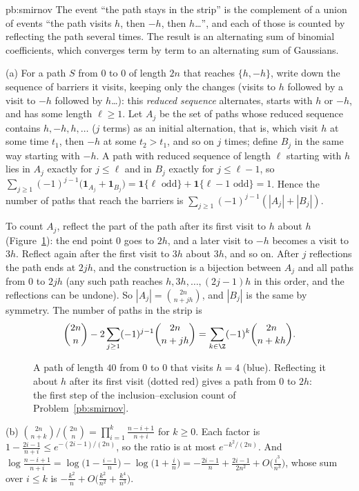 \begin{solution}{pb:smirnov}
\idea The event ``the path stays in the strip'' is the complement of a union of events ``the path visits $h$, then $-h$, then $h$\dots'', and each of those is counted by
reflecting the path several times. The result is an alternating sum of binomial coefficients, which converges term by term to an alternating sum of Gaussians.

\writeup (a) For a path $S$ from $0$ to $0$ of length $2n$ that reaches $\{h,-h\}$, write down the sequence of barriers it visits, keeping only the changes (visits to $h$
followed by a visit to $-h$ followed by $h$\dots): this \emph{reduced sequence} alternates, starts with $h$ or $-h$, and has some length $\ell\ge1$. Let $A_j$ be the set of
paths whose reduced sequence contains $h,-h,h,\dots$ ($j$ terms) as an initial alternation, that is, which visit $h$ at some time $t_1$, then $-h$ at some $t_2>t_1$, and
so on $j$ times; define $B_j$ in the same way starting with $-h$. A path with reduced sequence of length $\ell$ starting with $h$ lies in $A_j$ exactly for $j\le\ell$
and in $B_j$ exactly for $j\le\ell-1$, so $\sum_{j\ge1}(-1)^{j-1}\bigl(\mathbf 1_{A_j}+\mathbf 1_{B_j}\bigr)=\mathbf 1\{\ell\text{ odd}\}+\mathbf 1\{\ell-1\text{ odd}\}=1$. Hence the number of
paths that reach the barriers is $\sum_{j\ge1}(-1)^{j-1}(|A_j|+|B_j|)$.

To count $A_j$, reflect the part of the path after its first visit to $h$ about $h$ (Figure~\ref{fig:strip}): the end point $0$ goes to $2h$, and a later visit to $-h$
becomes a visit to $3h$. Reflect again after the first visit to $3h$ about $3h$, and so on. After $j$ reflections the path ends at $2jh$, and the construction is a bijection
between $A_j$ and all paths from $0$ to $2jh$ (any such path reaches $h,3h,\dots,(2j-1)h$ in this order, and the reflections can be undone). So
$|A_j|=\binom{2n}{n+jh}$, and $|B_j|$ is the same by symmetry. The number of paths in the strip is
\[
\binom{2n}n-2\sum_{j\ge1}(-1)^{j-1}\binom{2n}{n+jh}=\sum_{k\in\Z}(-1)^k\binom{2n}{n+kh}.
\]

\begin{figure}[ht]
\centering{}
\caption{A path of length $40$ from $0$ to $0$ that visits $h=4$ (blue). Reflecting it about $h$ after its first visit (dotted red) gives a path from $0$ to $2h$:
the first step of the inclusion--exclusion count of Problem~\ref{pb:smirnov}.}
\label{fig:strip}
\end{figure}

(b) $\binom{2n}{n+k}\big/\binom{2n}n=\prod_{i=1}^k\frac{n-i+1}{n+i}$ for $k\ge0$. Each factor is $1-\frac{2i-1}{n+i}\le e^{-(2i-1)/(2n)}$, so the ratio is at most $e^{-k^2/(2n)}$. And
$\log\frac{n-i+1}{n+i}=\log\bigl(1-\frac{i-1}n\bigr)-\log\bigl(1+\frac in\bigr)=-\frac{2i-1}n+\frac{2i-1}{2n^2}+O\bigl(\frac{i^3}{n^3}\bigr)$, whose sum over $i\le k$ is
$-\frac{k^2}n+O\bigl(\frac{k^2}{n^2}+\frac{k^4}{n^3}\bigr)$.


\end{solution}
